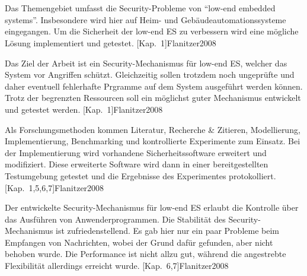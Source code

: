 
%
\section*{\thesisheading} %



 Das Themengebiet umfasst die Security-Probleme von \enquote{low-end embedded systems}. 
Insbesondere wird hier auf Heim- und Gebäudeautomationssysteme eingegangen. Um die Sicherheit der low-end ES zu 
verbessern wird eine mögliche Lösung implementiert und getestet. [Kap.~1]{Flanitzer2008}

 Das Ziel der Arbeit ist ein Security-Mechanismus für low-end ES, welcher das System 
vor Angriffen schützt. Gleichzeitig sollen trotzdem noch ungeprüfte und daher eventuell fehlerhafte Prgramme 
auf dem System ausgeführt werden können. Trotz der begrenzten Ressourcen soll ein möglichst guter Mechanismus 
entwickelt und getestet werden. [Kap.~1]{Flanitzer2008}

 Als Forschungsmethoden kommen Literatur, Recherche \& Zitieren, Modellierung, 
Implementierung, Benchmarking und kontrollierte Experimente zum Einsatz. Bei der Implementierung wird vorhandene
Sicherheitssoftware erweitert und modifiziert. Diese erweiterte Software wird dann in einer bereitgestellten Testumgebung
getestet und die Ergebnisse des Experimentes protokolliert. [Kap.~1,5,6,7]{Flanitzer2008}

 Der entwickelte Security-Mechanismus für low-end ES erlaubt die Kontrolle über das Ausführen von
Anwenderprogrammen. Die Stabilität des Security-Mechanismus ist zufriedenstellend. Es gab hier nur ein paar Probleme beim
Empfangen von Nachrichten, wobei der Grund dafür gefunden, aber nicht behoben wurde. Die Performance ist nicht allzu gut,
während die angestrebte Flexibilität allerdings erreicht wurde. [Kap.~6,7]{Flanitzer2008}


%
\section*{\thesisheading} %

